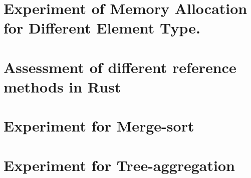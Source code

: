 \section{Experiment of Memory Allocation for Different Element Type.}
\label{sec:history}

\clearpage

\section{Assessment of different reference methods in Rust}
\label{sec:history}

\clearpage

\section{Experiment for Merge-sort}
\label{sec:history}

\clearpage

\section{Experiment for Tree-aggregation}
\label{sec:history}

\clearpage

